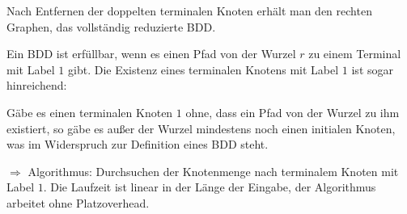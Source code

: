 Nach Entfernen der doppelten terminalen Knoten erhält man den rechten Graphen, das vollständig reduzierte BDD.

Ein BDD ist erfüllbar, wenn es einen Pfad von der Wurzel $r$ zu einem Terminal mit Label $1$ gibt. Die Existenz eines
terminalen Knotens mit Label $1$ ist sogar hinreichend:

Gäbe es einen terminalen Knoten $1$ ohne, dass ein Pfad von der Wurzel zu ihm existiert, so gäbe es außer der Wurzel
mindestens noch einen initialen Knoten, was im Widerspruch zur Definition eines BDD steht.

$\Rightarrow$ Algorithmus: Durchsuchen der Knotenmenge nach terminalem Knoten mit Label $1$. Die Laufzeit ist linear in
der Länge der Eingabe, der Algorithmus arbeitet ohne Platzoverhead.
